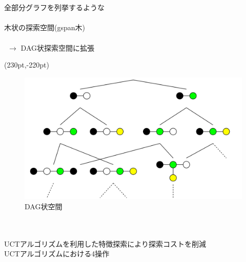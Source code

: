 \begin{tcolorbox}[colbacktitle=gray, title={\fontsize{35pt}{0pt}\selectfont 特徴探索}]
	 \\
	\vspace{80pt}\\
	全部分グラフを列挙するような\\
	\vspace{10pt}\\
	木状の探索空間(gspan木)\\
	\vspace{30pt}\\
	$~~ \rightarrow$ DAG状探索空間に拡張
	\begin{textblock*}{\textwidth}(230pt,-220pt)
		\begin{figure}[h]
			\includegraphics[width=0.42\hsize]{img/graph_search_tree.png} \\
			\vspace{5pt}
			DAG状空間
		\end{figure}
	\end{textblock*}
	
	\vspace{150pt}
	 \\
	\vspace{10pt}\\
	UCTアルゴリズムを利用した特徴探索により探索コストを削減
	\vspace{50pt}\\
	UCTアルゴリズムにおける4操作
	\vspace{20pt}


\end{tcolorbox}
